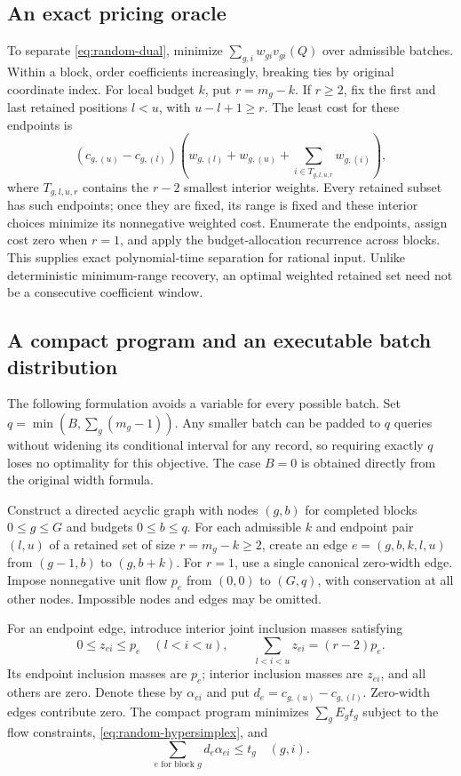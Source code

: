 \subsection{An exact pricing oracle}
To separate \eqref{eq:random-dual}, minimize
$\sum_{g,i}w_{gi}v_{gi}(Q)$ over admissible batches. Within a block, order
coefficients increasingly, breaking ties by original coordinate index.
For local budget $k$, put $r=m_g-k$. If $r\geq2$, fix the first and last
retained positions $l<u$, with $u-l+1\geq r$. The least cost for these
endpoints is
\begin{equation}
 (c_{g,(u)}-c_{g,(l)})
 \left(w_{g,(l)}+w_{g,(u)}+
       \sum_{i\in T_{g,l,u,r}}w_{g,(i)}\right),
 \label{eq:random-pricing}
\end{equation}
where $T_{g,l,u,r}$ contains the $r-2$ smallest interior weights.
Every retained subset has such endpoints; once they are fixed, its range
is fixed and these interior choices minimize its nonnegative weighted
cost. Enumerate the endpoints, assign cost zero when $r=1$, and apply
the budget-allocation recurrence across blocks. This supplies exact
polynomial-time separation for rational input. Unlike deterministic
minimum-range recovery, an optimal weighted retained set need not be
a consecutive coefficient window.

\subsection{A compact program and an executable batch distribution}
The following formulation avoids a variable for every possible batch.
Set $q=\min(B,\sum_g(m_g-1))$. Any smaller batch can be padded to $q$
queries without widening its conditional interval for any record, so
requiring exactly $q$ loses no optimality for this objective.
The case $B=0$ is obtained directly from the original width formula.

Construct a directed acyclic graph with nodes $(g,b)$ for completed
blocks $0\leq g\leq G$ and budgets $0\leq b\leq q$. For each admissible
$k$ and endpoint pair $(l,u)$ of a retained set of size $r=m_g-k\geq2$,
create an edge $e=(g,b,k,l,u)$ from $(g-1,b)$ to $(g,b+k)$.
For $r=1$, use a single canonical zero-width edge. Impose nonnegative
unit flow $p_e$ from $(0,0)$ to $(G,q)$, with conservation at all other
nodes. Impossible nodes and edges may be omitted.

For an endpoint edge, introduce interior joint inclusion masses satisfying
\begin{equation}
 0\leq z_{ei}\leq p_e\quad(l<i<u),\qquad
 \sum_{l<i<u}z_{ei}=(r-2)p_e.
 \label{eq:random-hypersimplex}
\end{equation}
Its endpoint inclusion masses are $p_e$; interior inclusion masses are
$z_{ei}$, and all others are zero. Denote these by $\alpha_{ei}$ and
put $d_e=c_{g,(u)}-c_{g,(l)}$. Zero-width edges contribute zero.
The compact program minimizes $\sum_gE_gt_g$ subject to the flow
constraints, \eqref{eq:random-hypersimplex}, and
\begin{equation}
 \sum_{e\text{ for block }g}d_e\alpha_{ei}\leq t_g
 \quad(g,i).
 \label{eq:random-compact}
\end{equation}

